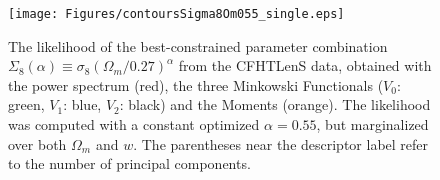 \documentclass[reprint,aps,prd,superscriptaddress,showkeys,showpacs]{revtex4-1}
\begin{document}
\begin{figure}
\begin{center}
\texttt{[image: Figures/contoursSigma8Om055\_single.eps]}
\end{center}
\caption{The likelihood of the best-constrained parameter combination
  $\Sigma_8(\alpha)\equiv\sigma_8(\Omega_m/0.27)^\alpha$ from the
  CFHTLenS data, obtained with the power spectrum (red), the three
  Minkowski Functionals ($V_0$: green, $V_1$: blue, $V_2$: black) and
  the Moments (orange).
  The likelihood was computed with a constant optimized $\alpha=0.55$,
  but marginalized over both $\Omega_m$ and $w$. 
  The parentheses near the descriptor label refer to the number of
  principal components.}
\label{likelihoodSi8single}
\end{figure}
\end{document}
